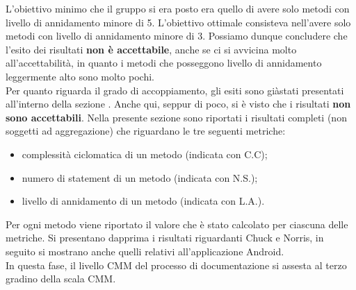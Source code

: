 				L'obiettivo minimo che il gruppo si era posto era quello di avere solo metodi con livello di annidamento minore di 5. L'obiettivo ottimale consisteva nell'avere solo metodi con livello di annidamento minore di 3. Possiamo dunque concludere che l'esito dei risultati \textbf{non è accettabile}, anche se ci si avvicina molto all'accettabilità, in quanto i metodi che posseggono livello di annidamento leggermente alto sono molto pochi.\\
				Per quanto riguarda il grado di accoppiamento, gli esiti sono giàstati presentati all'interno della sezione . Anche qui, seppur di poco, si è visto che i risultati \textbf{non sono accettabili}.
				Nella presente sezione sono riportati i risultati completi (non soggetti ad aggregazione) che riguardano le tre seguenti metriche:
				\begin{itemize}
					\item complessità ciclomatica di un metodo (indicata con C.C);
					\item numero di statement di un metodo (indicata con N.S.);
					\item livello di annidamento di un metodo (indicata con L.A.).
				\end{itemize}
				Per ogni metodo viene riportato il valore che è stato calcolato per ciascuna delle metriche. Si presentano dapprima i risultati riguardanti Chuck e Norris, in seguito si mostrano anche quelli relativi all'applicazione Android.\\
				
				

			 
			In questa fase, il livello CMM del processo di documentazione si assesta al terzo gradino della scala CMM.

